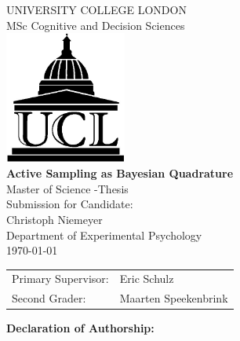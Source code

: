 \documentclass[oneside, 11pt]{book}
\begin{document}
\newcommand{\hmwkCourse}{MSc Cognitive and Decision Sciences\vspace{18mm}}
\newcommand{\hmwkTitle}{{\bf Active Sampling as Bayesian Quadrature} \vspace{18mm} \\ 
Master of Science -Thesis}
\newcommand{\hmwkSubTitle}{} %
\newcommand{\hmwkDueDate}{\today}
\newcommand{\hmwkClassInstructor}{}
\newcommand{\hmwkAuthorName}{Christoph Niemeyer}
\newcommand{\LastPage}{TBA}

\begin{titlepage}
\vspace{20mm}
\begin{center}
\vspace{150mm}
\LARGE{ UNIVERSITY COLLEGE LONDON \\ \hmwkCourse \\[6.5cm]
\includegraphics[width=4cm]{ucl.jpg}\\
\vspace{-110mm}
 {\hmwkTitle}  \\}
\vspace{80mm}
\Large Submission for Candidate:\\
Christoph Niemeyer\\
Department of Experimental Psychology
\\
\Large \today\vspace{28mm} \\ 
\begin{tabular}{ll}
Primary Supervisor:&Eric Schulz\\
Second Grader: &Maarten Speekenbrink
\end{tabular}
\end{center}
\end{titlepage}
\vspace*{1cm}
\begin{center}
\textbf{{\LARGE Declaration of Authorship:}}\\
\end{center}
\vspace{1cm}
\end{document}
